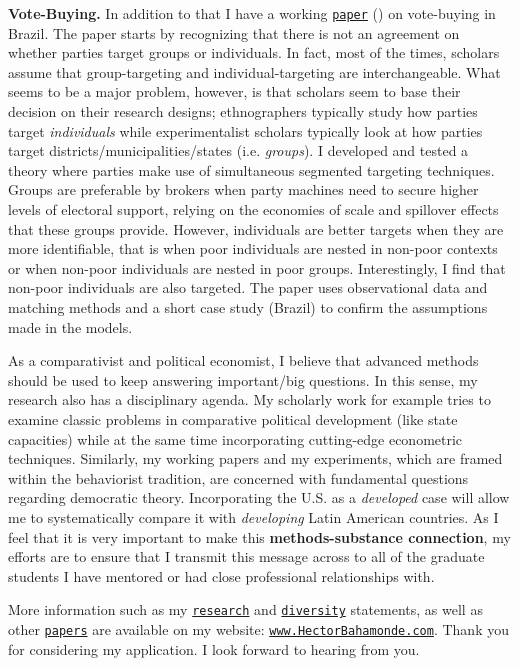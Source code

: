 \documentclass[10pt,stdletter,dateno,sigleft]{newlfm} %
\begin{document}
\begin{newlfm}
{\bf Vote-Buying.} In addition to that I have a working \href{https://github.com/hbahamonde/Clientelism_paper/raw/master/Bahamonde_Clientelism_Paper.pdf}{\texttt{paper}} (\emph{\unskip}) on vote-buying in Brazil. The paper starts by recognizing that there is not an agreement on whether parties target groups or individuals. In fact, most of the times, scholars assume that group-targeting and individual-targeting are interchangeable. What seems to be a major problem, however, is that scholars seem to base their decision on their research designs; ethnographers typically study how parties target \emph{individuals} while experimentalist scholars typically look at how parties target districts/municipalities/states (i.e. \emph{groups}). I developed and tested a theory where parties make use of simultaneous segmented targeting techniques. Groups are preferable by brokers when party machines need to secure higher levels of electoral support, relying on the economies of scale and spillover effects that these groups provide. However, individuals are better targets when they are more identifiable, that is when poor individuals are nested in non-poor contexts or when non-poor individuals are nested in poor groups. Interestingly, I find that non-poor individuals are also targeted. The paper uses observational data and matching methods and a short case study (Brazil) to confirm the assumptions made in the models.

As a comparativist and political economist, I believe that advanced methods should be used to keep answering important/big questions. In this sense, my research also has a disciplinary agenda. My scholarly work for example tries to examine classic problems in comparative political development (like state capacities) while at the same time incorporating cutting-edge econometric techniques. Similarly, my working papers and my experiments, which are framed within the behaviorist tradition, are concerned with fundamental questions regarding democratic theory. Incorporating the U.S. as a \emph{developed} case will allow me to systematically compare it with \emph{developing} Latin American countries. As I feel that it is very important to make this {\bf methods-substance connection}, my efforts are to ensure that I transmit this message across to all of the graduate students I have mentored or had close professional relationships with. 


More information such as my \href{http://github.com/hbahamonde/Job_Market/raw/master/Bahamonde_Research_Statement.pdf}{\texttt{research}} and \href{http://github.com/hbahamonde/Job_Market/raw/master/Bahamonde_Diversity_Statement.pdf}{\texttt{diversity}} statements, as well as other \href{http://www.hectorbahamonde.com/research/}{\texttt{papers}} are available on my website: \href{http://www.hectorbahamonde.com}{\texttt{www.HectorBahamonde.com}}. Thank you for considering my application. I look forward to hearing from you.






\end{newlfm}
\end{document}
